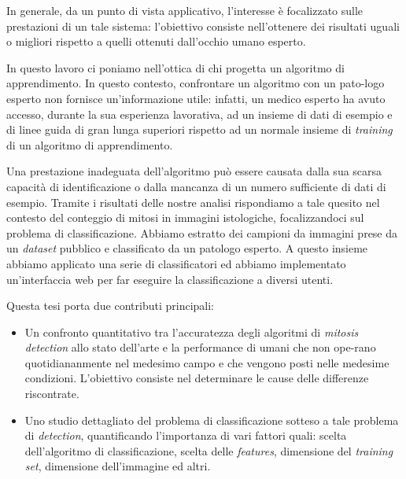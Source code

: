 \vspace{0.3cm}

In generale, da un punto di vista applicativo, l'interesse \`{e} focalizzato sulle prestazioni di un tale sistema: l'obiettivo
consiste nell'ottenere dei risultati uguali o migliori rispetto a quelli ottenuti dall'occhio umano esperto.

\vspace{0.3cm}

In questo lavoro ci poniamo nell'ottica di chi progetta un algoritmo di apprendimento. In questo contesto,
confrontare un algoritmo con un pato-logo esperto non fornisce un'informazione utile: infatti, un medico esperto ha avuto accesso,
durante la sua esperienza lavorativa, ad un insieme di dati di esempio e di linee guida di gran lunga superiori rispetto ad un normale
insieme di \textit{training} di un algoritmo di apprendimento.


\vspace{0.3cm}

Una prestazione inadeguata dell'algoritmo pu\`{o} essere causata dalla sua scarsa capacit\`{a} di identificazione o dalla
mancanza di un numero sufficiente di dati di esempio.
Tramite i risultati delle nostre analisi rispondiamo a tale quesito nel contesto del conteggio di mitosi in immagini istologiche, focalizzandoci sul problema di classificazione.
Abbiamo estratto dei campioni da immagini prese da un \textit{dataset} pubblico e classificato da un patologo esperto.
A questo insieme abbiamo applicato una serie di classificatori ed abbiamo implementato un'interfaccia web per far eseguire 
la classificazione a diversi utenti.

\vspace{0.3cm}

\noindent Questa tesi porta due contributi principali:
\begin{itemize}
 \item Un confronto quantitativo tra l'accuratezza degli algoritmi di \textit{mitosis detection} allo stato dell'arte e la performance di umani che non ope-rano quotidiananmente nel medesimo campo
 e che vengono posti nelle medesime condizioni. L'obiettivo consiste nel determinare le cause delle differenze riscontrate.
 \item Uno studio dettagliato del problema di classificazione sotteso a tale problema di \textit{detection}, quantificando l'importanza di vari fattori quali:
 scelta dell'algoritmo di classificazione, scelta delle \textit{features}, dimensione del \textit{training set}, dimensione dell'immagine ed altri.
\end{itemize}

